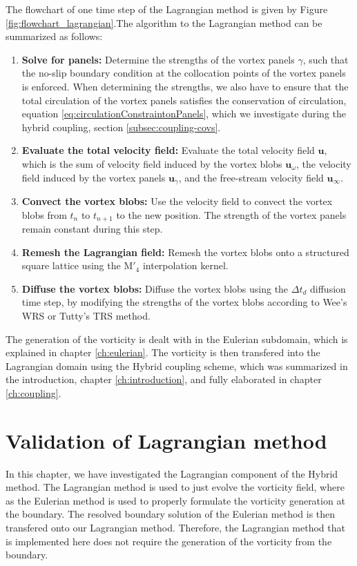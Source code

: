 The flowchart of one time step of the Lagrangian method is given by Figure \ref{fig:flowchart_lagrangian}.The algorithm to the Lagrangian method can be summarized as follows:
	\begin{enumerate}
	\item \textbf{Solve for panels:} Determine the strengths of the vortex panels $\gamma$, such that the no-slip boundary condition at the collocation points of the vortex panels is enforced. When determining the strengths, we also have to ensure that the total circulation of the vortex panels satisfies the conservation of circulation, equation \ref{eq:circulationConstraintonPanels}, which we investigate during the hybrid coupling, section \ref{subsec:coupling-covs}.
	
	\item \textbf{Evaluate the total velocity field:} Evaluate the total velocity field $\mathbf{u}$, which is the sum of velocity field induced by the vortex blobs $\mathbf{u}_{\omega}$, the velocity field induced by the vortex panels $\mathbf{u}_{\gamma}$, and the free-stream velocity field $\mathbf{u}_{\infty}$. 
	\item \textbf{Convect the vortex blobs:} Use the velocity field to convect the vortex blobs from $t_n$ to $t_{n+1}$ to the new position. The strength of the vortex panels remain constant during this step.
	\item \textbf{Remesh the Lagrangian field:} Remesh the vortex blobs onto a structured square lattice using the $\mathrm{M}'_4$ interpolation kernel.
	\item \textbf{Diffuse the vortex blobs:} Diffuse the vortex blobs using the $\Delta t_d$ diffusion time step, by modifying the strengths of the vortex blobs according to Wee's WRS or Tutty's TRS method.
	\end{enumerate}

The generation of the vorticity is dealt with in the Eulerian subdomain, which is explained in chapter \ref{ch:eulerian}. The vorticity is then transfered into the Lagrangian domain using the Hybrid coupling scheme, which was summarized in the introduction, chapter \ref{ch:introduction}, and fully elaborated in chapter \ref{ch:coupling}.

%
\section{Validation of Lagrangian method}
\label{sec:volm}
In this chapter, we have investigated the Lagrangian component of the Hybrid method. The Lagrangian method is used to just evolve the vorticity field, where as the Eulerian method is used to properly formulate the vorticity generation at the boundary. The resolved boundary solution of the Eulerian method is then transfered onto our Lagrangian method. Therefore, the Lagrangian method that is implemented here does not require the generation of the vorticity from the boundary. 

